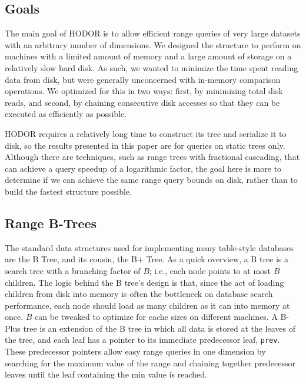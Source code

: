 \documentclass[11pt, oneside]{article}
\newcommand{\ms}{\texttt}
\begin{document}
\subsection{Goals}

The main goal of HODOR is to allow efficient range queries of very large
datasets with an arbitrary number of dimensions. We designed the structure to
perform on machines with a limited amount of memory and a large amount of
storage on a relatively slow hard disk. As such, we wanted to minimize the
time spent reading data from disk, but were generally unconcerned with
in-memory comparison operations. We optimized for this in two ways: first, by
minimizing total disk reads, and second, by chaining consecutive disk accesses
so that they can be executed as efficiently as possible. 

HODOR requires a relatively long time to construct its tree and serialize it to
disk, so the results presented in this paper are for queries on static trees
only. Although there are techniques, such as range trees with fractional cascading,
that can achieve a query speedup of a logarithmic factor, the goal here is more
to determine if we can achieve the same range query bounds on disk, rather than
to build the fastest structure possible.

\subsection{Range B-Trees}

The standard data structures used for implementing many table-style databases
are the B Tree, and its cousin, the B+ Tree. As a quick overview, a B tree is a
search tree with a branching factor of $B$; i.e., each node points to at most
$B$ children. The logic behind the B tree's design is that, since the act of
loading children from disk into memory is often the bottleneck on database
search performance, each node should load as many children as it can into memory
at once. $B$ can be tweaked to optimize for cache sizes on different machines.
A B-Plus tree is an extension of the B tree in which all data is stored at the
leaves of the tree, and each leaf has a pointer to its immediate predecessor
leaf, \ms{prev}. These predecessor pointers allow easy range queries in one
dimension by searching for the maximum value of the range and chaining together
predecessor leaves until the leaf containing the min value is reached.
\end{document}
